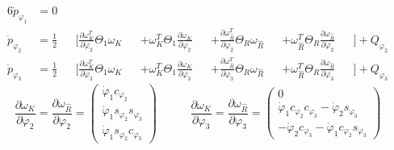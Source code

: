 \begin{alignat}{6}
\dot{p}_{\varphi_1} &= 0  && && &&
\\
\dot{p}_{\varphi_2} &= \frac{1}{2} &&\Bigg[ \frac{\partial \omega^T_K}{\partial \varphi_2} \Theta_1 \omega_K &&+ \omega^T_K \Theta_1 \frac{\partial \omega_K}{\partial \varphi_2} &&+ \frac{\partial \omega^T_{\widehat{R}}}{\partial \varphi_2} \Theta_R \omega_{\widehat{R}} &&+ \omega^T_{\widehat{R}}  \Theta_R \frac{\partial \omega_{\widehat{R}}}{\partial \varphi_2} &&\Bigg] + Q_{\varphi_2}
\\
\dot{p}_{\varphi_3} &= \frac{1}{2} &&\Bigg[ \frac{\partial \omega^T_K}{\partial \varphi_3} \Theta_1 \omega_K &&+ \omega^T_K \Theta_1 \frac{\partial \omega_K}{\partial \varphi_3} &&+ 
\frac{\partial \omega^T_{\widehat{R}}}{\partial \varphi_3}\Theta_R \omega_{\widehat{R}} &&+ \omega^T_{\widehat{R}} \Theta_R \frac{\partial \omega_{\widehat{R}}}{\partial \varphi_3} 
&&\Bigg] + Q_{\varphi_3}
\end{alignat}
\begin{equation}
\frac{\partial \omega_K}{\partial \varphi_2} = \frac{\partial \omega_{\widehat{R}}}{\partial \varphi_2} = \begin{pmatrix} \dot{\varphi}_1 c_{\varphi_2} \\ \dot{\varphi}_1 s_{\varphi_2}s_{\varphi_3} \\ \dot{\varphi}_1 s_{\varphi_2} c_{\varphi_3}\end{pmatrix} \hspace{35pt}
\frac{\partial \omega_K}{\partial \varphi_3} = \frac{\partial \omega_{\widehat{R}}}{\partial \varphi_3} = \begin{pmatrix}
0 \\ \dot{\varphi}_1  c_{\varphi_2} c_{\varphi_3} - \dot{\varphi}_2  s_{\varphi_3} \\
-\dot{\varphi}_2 c_{\varphi_3} - \dot{\varphi}_1 c_{\varphi_2} s_{\varphi_3}
\end{pmatrix}
\end{equation}